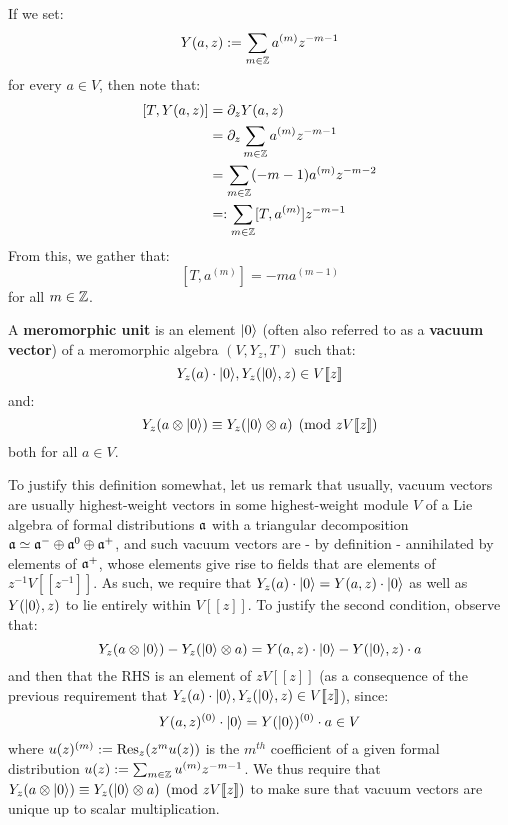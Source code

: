        \begin{remark}
            If we set:
                $$Y(a, z) := \sum_{m \in \mathbb{Z}} a^{(m)} z^{-m - 1}$$
            for every $a \in V$, then note that:
                $$
                    \begin{aligned}
                        [T, Y(a, z)] & = \del_z Y(a, z)
                        \\
                        & = \del_z \sum_{m \in \Z} a^{(m)} z^{-m - 1}
                        \\
                        & = \sum_{m \in \Z} (-m - 1) a^{(m)} z^{-m - 2}
                        \\
                        & =: \sum_{m \in \Z} [T, a^{(m)}] z^{-m - 1}
                    \end{aligned}
                $$
            From this, we gather that:
                $$[T, a^{(m)}] = -m a^{(m - 1)}$$
            for all $m \in \mathbb{Z}$.
        \end{remark}

        \begin{definition} \label{def: meromorphic_units}
            A \textbf{meromorphic unit} is an element $\lvert {0} \rangle$ (often also referred to as a \textbf{vacuum vector}) of a meromorphic algebra $(V, Y_z, T)$ such that:
                $$Y_z(a) \cdot \lvert {0} \rangle, Y_z( \lvert {0} \rangle, z ) \in V[\![z]\!]$$
            and:
                $$Y_z( a \tensor \ket{0} ) \equiv Y_z( \ket{0} \tensor a ) \pmod{ zV[\![z]\!] }$$
            both for all $a \in V$.
        \end{definition}
        To justify this definition somewhat, let us remark that usually, vacuum vectors are usually highest-weight vectors in some highest-weight module $V$ of a Lie algebra of formal distributions $\mathfrak{a}$ with a triangular decomposition $\mathfrak{a} \simeq \mathfrak{a}^- \oplus \mathfrak{a}^0 \oplus \mathfrak{a}^+$, and such vacuum vectors are - by definition - annihilated by elements of $\mathfrak{a}^+$, whose elements give rise to fields that are elements of $z^{-1}V[\![z^{-1}]\!]$. As such, we require that $Y_z(a) \cdot \lvert {0} \rangle = Y(a, z) \cdot \lvert {0} \rangle$ as well as $Y(\lvert {0} \rangle, z)$ to lie entirely within $V[\![z]\!]$. To justify the second condition, observe that:
            $$Y_z( a \tensor \ket{0} ) - Y_z( \ket{0} \tensor a ) = Y(a, z) \cdot \ket{0} - Y(\ket{0}, z) \cdot a$$
        and then that the RHS is an element of $zV[\![z]\!]$ (as a consequence of the previous requirement that $Y_z(a) \cdot \lvert {0} \rangle, Y_z( \lvert {0} \rangle, z ) \in V[\![z]\!]$), since:
            $$Y(a, z)^{(0)} \cdot \lvert {0} \rangle = Y(\lvert {0} \rangle)^{(0)} \cdot a \in V$$
        where $u(z)^{(m)} := \mathrm{Res}_z (z^m u(z))$ is the $m^{th}$ coefficient of a given formal distribution $u(z) := \sum_{m \in \mathbb{Z}} u^{(m)} z^{-m - 1}$. We thus require that $Y_z( a \tensor \ket{0} ) \equiv Y_z( \ket{0} \tensor a ) \pmod{ zV[\![z]\!] }$ to make sure that vacuum vectors are unique up to scalar multiplication.

